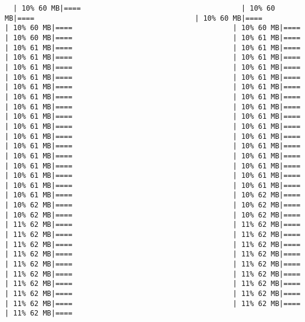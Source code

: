\documentclass[
]{article}
\begin{document}
\begin{verbatim}
  | 10% 60 MB|====                                      | 10% 60 MB|====                                      | 10% 60 MB|====                                      | 10% 60 MB|====                                      | 10% 60 MB|====                                      | 10% 60 MB|====                                      | 10% 61 MB|====                                      | 10% 61 MB|====                                      | 10% 61 MB|====                                      | 10% 61 MB|====                                      | 10% 61 MB|====                                      | 10% 61 MB|====                                      | 10% 61 MB|====                                      | 10% 61 MB|====                                      | 10% 61 MB|====                                      | 10% 61 MB|====                                      | 10% 61 MB|====                                      | 10% 61 MB|====                                      | 10% 61 MB|====                                      | 10% 61 MB|====                                      | 10% 61 MB|====                                      | 10% 61 MB|====                                      | 10% 61 MB|====                                      | 10% 61 MB|====                                      | 10% 61 MB|====                                      | 10% 61 MB|====                                      | 10% 61 MB|====                                      | 10% 61 MB|====                                      | 10% 61 MB|====                                      | 10% 61 MB|====                                      | 10% 61 MB|====                                      | 10% 61 MB|====                                      | 10% 61 MB|====                                      | 10% 61 MB|====                                      | 10% 61 MB|====                                      | 10% 61 MB|====                                      | 10% 61 MB|====                                      | 10% 61 MB|====                                      | 10% 62 MB|====                                      | 10% 62 MB|====                                      | 10% 62 MB|====                                      | 10% 62 MB|====                                      | 10% 62 MB|====                                      | 11% 62 MB|====                                      | 11% 62 MB|====                                      | 11% 62 MB|====                                      | 11% 62 MB|====                                      | 11% 62 MB|====                                      | 11% 62 MB|====                                      | 11% 62 MB|====                                      | 11% 62 MB|====                                      | 11% 62 MB|====                                      | 11% 62 MB|====                                      | 11% 62 MB|====                                      | 11% 62 MB|====                                      | 11% 62 MB|====                                      | 11% 62 MB|====                                      | 11% 62 MB|====                                      | 11% 62 MB|====                                      | 11% 62 MB|====                                      | 11% 62 MB|====                                      | 11% 62 MB|====       
\end{verbatim}
\end{document}
